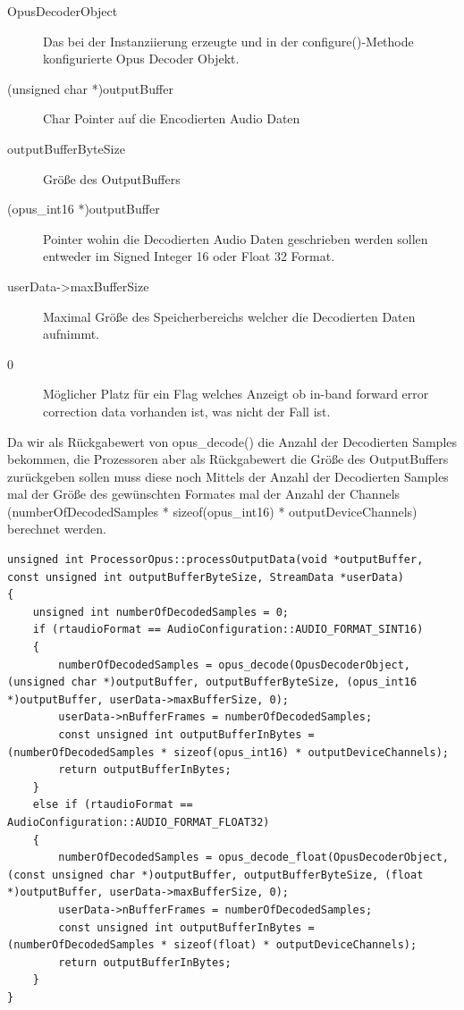 \begin{description}
\item[OpusDecoderObject] Das bei der Instanziierung erzeugte und in der configure()-Methode konfigurierte Opus Decoder Objekt.
\item[(unsigned char *)outputBuffer] Char Pointer auf die Encodierten Audio Daten
\item[outputBufferByteSize] Größe des OutputBuffers
\item[(opus\_int16 *)outputBuffer] Pointer wohin die Decodierten Audio Daten geschrieben werden sollen entweder im Signed Integer 16 oder Float 32 Format.
\item[userData->maxBufferSize] Maximal Größe des Speicherbereichs welcher die Decodierten Daten aufnimmt.
\item[0] Möglicher Platz für ein Flag welches Anzeigt ob in-band forward error correction data vorhanden ist, was nicht der Fall ist.
\end{description}

Da wir als Rückgabewert von opus\_decode() die Anzahl der Decodierten Samples bekommen, die Prozessoren aber als Rückgabewert die Größe des OutputBuffers zurückgeben sollen muss diese noch Mittels der Anzahl der Decodierten Samples mal der Größe des gewünschten Formates mal der Anzahl der Channels (numberOfDecodedSamples * sizeof(opus\_int16) * outputDeviceChannels) berechnet werden.

\begin{lstlisting}[caption={Decodieren von Audio Daten mittels Opus},label={Code:Opus}]
unsigned int ProcessorOpus::processOutputData(void *outputBuffer, const unsigned int outputBufferByteSize, StreamData *userData)
{
    unsigned int numberOfDecodedSamples = 0;
    if (rtaudioFormat == AudioConfiguration::AUDIO_FORMAT_SINT16)
    {
        numberOfDecodedSamples = opus_decode(OpusDecoderObject, (unsigned char *)outputBuffer, outputBufferByteSize, (opus_int16 *)outputBuffer, userData->maxBufferSize, 0);
        userData->nBufferFrames = numberOfDecodedSamples;
        const unsigned int outputBufferInBytes = (numberOfDecodedSamples * sizeof(opus_int16) * outputDeviceChannels);
        return outputBufferInBytes;
    }
    else if (rtaudioFormat == AudioConfiguration::AUDIO_FORMAT_FLOAT32)
    {
        numberOfDecodedSamples = opus_decode_float(OpusDecoderObject, (const unsigned char *)outputBuffer, outputBufferByteSize, (float *)outputBuffer, userData->maxBufferSize, 0);
        userData->nBufferFrames = numberOfDecodedSamples;
        const unsigned int outputBufferInBytes = (numberOfDecodedSamples * sizeof(float) * outputDeviceChannels);
        return outputBufferInBytes;
    }
}
\end{lstlisting}

